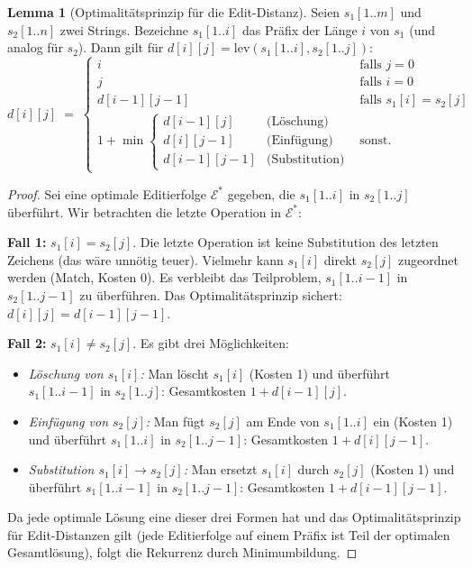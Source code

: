 ﻿\documentclass[a4paper,12pt]{article}
\theoremstyle{definition}
\newtheorem{lemma}{Lemma}
\begin{document}
\begin{lemma}[Optimalitätsprinzip für die Edit-Distanz]
    \label{lemma:opt}
    Seien $s_1[1..m]$ und $s_2[1..n]$ zwei Strings. Bezeichne $s_1[1..i]$
    das Präfix der Länge $i$ von $s_1$ (und analog für $s_2$). Dann gilt
    für $d[i][j] = \mathrm{lev}(s_1[1..i], s_2[1..j])$:
    \[
        d[i][j] \;=\; \begin{cases}
            i & \text{falls } j = 0 \\
            j & \text{falls } i = 0 \\
            d[i-1][j-1] & \text{falls } s_1[i] = s_2[j] \\[4pt]
            1 + \min\!\begin{cases}
                d[i-1][j]   & \text{(Löschung)} \\
                d[i][j-1]   & \text{(Einfügung)} \\
                d[i-1][j-1] & \text{(Substitution)}
            \end{cases} & \text{sonst.}
        \end{cases}
    \]
\end{lemma}

\begin{proof}
    Sei eine optimale Editierfolge $\mathcal{E}^*$ gegeben, die $s_1[1..i]$ in
    $s_2[1..j]$ überführt. Wir betrachten die letzte Operation in $\mathcal{E}^*$:

    \textbf{Fall 1:} $s_1[i] = s_2[j]$.
    Die letzte Operation ist keine Substitution des letzten Zeichens
    (das wäre unnötig teuer). Vielmehr kann $s_1[i]$ direkt $s_2[j]$ zugeordnet
    werden (Match, Kosten 0). Es verbleibt das Teilproblem, $s_1[1..i-1]$ in
    $s_2[1..j-1]$ zu überführen. Das Optimalitätsprinzip sichert:
    $d[i][j] = d[i-1][j-1]$.

    \textbf{Fall 2:} $s_1[i] \neq s_2[j]$. Es gibt drei Möglichkeiten:
    \begin{itemize}
        \item \emph{Löschung von $s_1[i]$:} Man löscht $s_1[i]$ (Kosten 1) und
              überführt $s_1[1..i-1]$ in $s_2[1..j]$: Gesamtkosten $1 + d[i-1][j]$.
        \item \emph{Einfügung von $s_2[j]$:} Man fügt $s_2[j]$ am Ende von
              $s_1[1..i]$ ein (Kosten 1) und überführt $s_1[1..i]$ in
              $s_2[1..j-1]$: Gesamtkosten $1 + d[i][j-1]$.
        \item \emph{Substitution $s_1[i] \to s_2[j]$:} Man ersetzt $s_1[i]$ durch
              $s_2[j]$ (Kosten 1) und überführt $s_1[1..i-1]$ in $s_2[1..j-1]$:
              Gesamtkosten $1 + d[i-1][j-1]$.
    \end{itemize}
    Da jede optimale Lösung eine dieser drei Formen hat und das Optimalitätsprinzip
    für Edit-Distanzen gilt (jede Editierfolge auf einem Präfix ist Teil der
    optimalen Gesamtlösung), folgt die Rekurrenz durch Minimumbildung. \qedhere
\end{proof}
\end{document}
